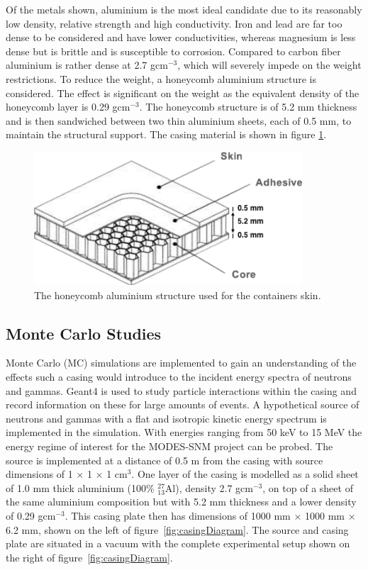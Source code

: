 Of the metals shown, aluminium is the most ideal candidate due to its reasonably low density, relative strength and high conductivity. Iron and lead are far too dense to be considered and have lower conductivities, whereas magnesium is less dense but is brittle and is susceptible to corrosion. Compared to carbon fiber aluminium is rather dense at 2.7 gcm$^{-3}$, which will severely impede on the weight restrictions. To reduce the weight, a honeycomb aluminium structure is considered. The effect is significant on the weight as the equivalent density of the honeycomb layer is 0.29 gcm$^{-3}$. The honeycomb structure is of 5.2 mm thickness and is then sandwiched between two thin aluminium sheets, each of 0.5 mm, to maintain the structural support. The casing material is shown in figure \ref{fig:casingMaterialGraphic}.

\begin{figure}[htbp]
\begin{center}
\includegraphics[width=100mm]{Chapter6/figures/casingMaterialGraphic.png}
\caption{The honeycomb aluminium structure used for the containers skin.}
\label{fig:casingMaterialGraphic}
\end{center}
\end{figure}

\subsection{Monte Carlo Studies}
Monte Carlo (MC) simulations are implemented to gain an understanding of the effects such a casing would introduce to the incident energy spectra of neutrons and gammas. Geant4 \cite{GEANT} is used to study particle interactions within the casing and record information on these for large amounts of events. A hypothetical source of neutrons and gammas with a flat and isotropic kinetic energy spectrum is implemented in the simulation. With energies ranging from 50 keV to 15 MeV the energy regime of interest for the MODES-SNM project can be probed. The source is implemented at a distance of 0.5 m from the casing with source dimensions of 1 $\times$ 1 $\times$ 1 cm$^{3}$. One layer of the casing is modelled as a solid sheet of 1.0 mm thick aluminium (100\% $^{27}_{13}$Al), density 2.7 gcm$^{-3}$, on top of a sheet of the same aluminium composition but with 5.2 mm thickness and a lower density of 0.29 gcm$^{-3}$. This casing plate then has dimensions of 1000 mm $\times$ 1000 mm $\times$ 6.2 mm, shown on the left of figure~\ref{fig:casingDiagram}. The source and casing plate are situated in a vacuum with the complete experimental setup shown on the right of figure~\ref{fig:casingDiagram}. 

